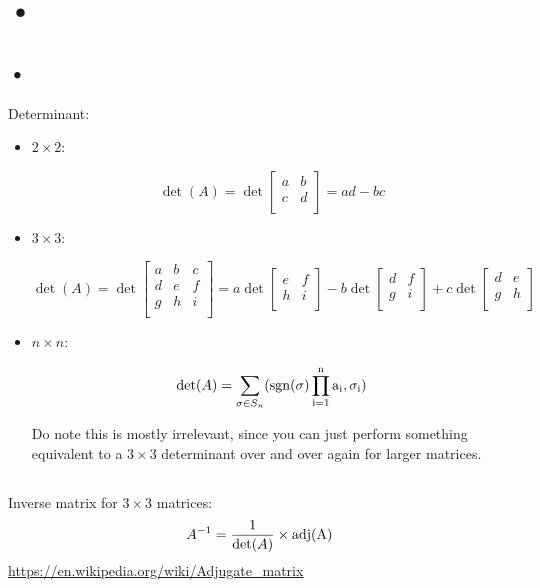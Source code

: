 \documentclass{report}
\begin{document}
\section{•}

\subsection{•}
Determinant:
\begin{itemize}
\item$2\times2$:

$$\det(A)=\det\begin{bmatrix}a&b\\c&d\\\end{bmatrix}=ad-bc$$
\item$3\times3$:

$$\det(A)=\det\begin{bmatrix}a&b&c\\d&e&f\\g&h&i\\\end{bmatrix}=a\det\begin{bmatrix}e&f\\h&i\\\end{bmatrix}-b\det\begin{bmatrix}d&f\\g&i\\\end{bmatrix}+c\det\begin{bmatrix}d&e\\g&h\\\end{bmatrix}$$

\item$n\times n$:

$$\det(A)=\sum_{\sigma\in S_n}(\rm{sgn}(\sigma)\prod_{i=1}^{n}a_i,\sigma_i )$$

Do note this is mostly irrelevant, since you can just perform something equivalent to a $3\times3$ determinant over and over again for larger matrices.
\end{itemize}

\subsection{}
Inverse matrix for $3\times3$ matrices:
$$A^{-1}=\frac{1}{\det(A)}\times \rm{adj}(A)$$
\url{https://en.wikipedia.org/wiki/Adjugate_matrix}
\end{document}
